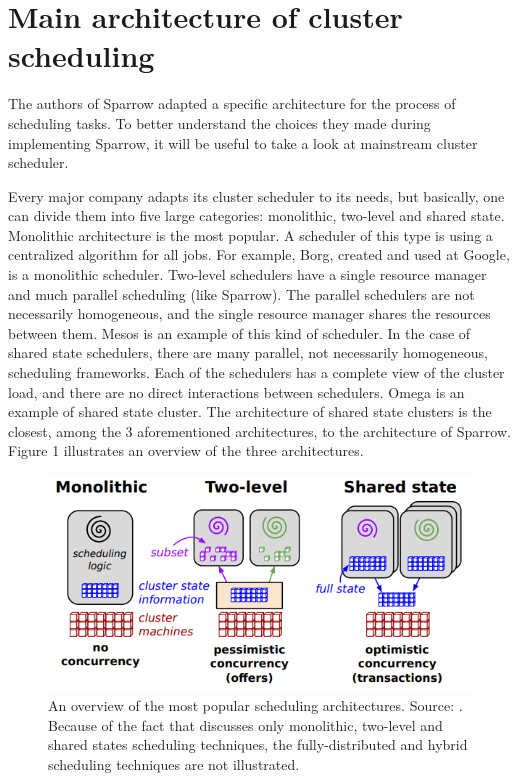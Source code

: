 \documentclass[11pt]{article}
\begin{document}
\section{Main architecture of cluster scheduling}

	The authors of Sparrow adapted a specific architecture for the process of scheduling tasks. To better understand the choices they made during implementing Sparrow, it will be useful to take a look at mainstream cluster scheduler.
    
	Every major company adapts its cluster scheduler to its needs, but basically, one can divide them into five large categories: monolithic, two-level and shared state. Monolithic architecture is the most popular. A scheduler of this type is using a centralized algorithm for all jobs. For example, Borg, created and used at Google, is a monolithic scheduler. Two-level schedulers have a single resource manager and much parallel scheduling (like Sparrow). The parallel schedulers are not necessarily homogeneous, and the single resource manager shares the resources between them. Mesos \cite{mesos} is an example of this kind of scheduler. In the case of shared state schedulers, there are many parallel, not necessarily homogeneous, scheduling frameworks. Each of the schedulers has a complete view of the cluster load, and there are no direct interactions between schedulers. Omega \cite{omega} is an example of shared state cluster. The architecture of shared state clusters is the closest, among the 3 aforementioned architectures, to the architecture of Sparrow. Figure 1 illustrates an overview of the three architectures.
    
    \begin{figure}
    	\includegraphics[scale=.6]{architectures}
        \caption{An overview of the most popular scheduling architectures. Source: \cite{omega}. Because of the fact that \cite{omega} discusses only monolithic, two-level and shared states scheduling techniques, the fully-distributed and hybrid scheduling techniques are not illustrated.}
    \end{figure}
\end{document}
